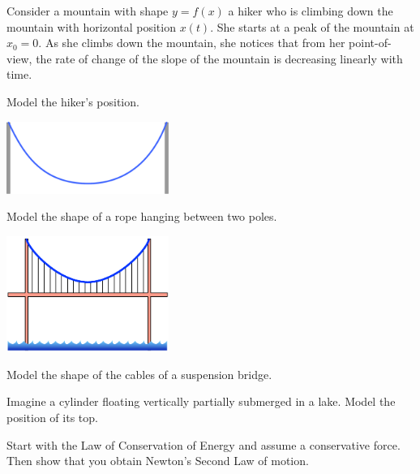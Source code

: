 \begin{exercises}

	\begin{problist}
	
	\prob Consider a mountain with shape $y=f(x)$ a hiker who is climbing down the mountain with horizontal position $x(t)$. She starts at a peak of the mountain at $x_0=0$. As she climbs down the mountain, she notices that from her point-of-view, the rate of change of the slope of the mountain is decreasing linearly with time.
	
		Model the hiker's position.
	
	\prob 
	
		\begin{center}
		\includegraphics*[width=150pt]{images/module18-catenary.pdf}
	\end{center}

	\prob Model the shape of a rope hanging between two poles.

	\begin{center}
		\includegraphics*[width=150pt]{images/module18-suspensionbridge.pdf}
	\end{center}

	\prob Model the shape of the cables of a suspension bridge.
	
	\prob Imagine a cylinder floating vertically partially submerged in a lake. Model the position of its top.
	
	
	\prob Start with the Law of Conservation of Energy and assume a conservative force. Then show that you obtain Newton's Second Law of motion.
	
	\end{problist}
\end{exercises}
